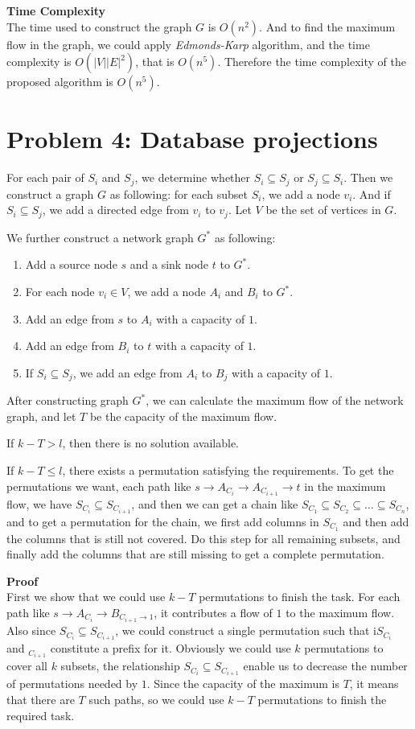 \documentclass{article}
\newcommand{\Complexity}{\vspace{0.3cm} \noindent\textbf{Time Complexity} \\}
\newcommand{\Proof}{\vspace{0.3cm} \noindent\textbf{Proof} \\}
\begin{document}
\Complexity
The time used to construct the graph $G$ is $O(n^2)$. And to find the maximum flow in the graph, we
could apply \textit{Edmonds-Karp} algorithm, and the time complexity is $O(|V||E|^2)$, that is
$O(n^5)$. Therefore the time complexity of the proposed algorithm is $O(n^5)$.

\section*{Problem 4: Database projections}
For each pair of $S_i$ and $S_j$, we determine whether $S_i \subseteq S_j$ or $S_j \subseteq
S_i$. Then we construct a graph $G$ as following: for each subset $S_i$, we add a node $v_i$. And if $S_i
\subseteq S_j$, we add a directed edge from $v_i$ to $v_j$. Let $V$ be the set of vertices in $G$.

We further construct a network graph $G^*$ as following:
\begin{enumerate}
  \item Add a source node $s$ and a sink node $t$ to $G^*$.
  \item For each node $v_i \in V$, we add a node $A_i$ and $B_i$ to $G^*$.
  \item Add an edge from $s$ to $A_i$ with a capacity of $1$.  
  \item Add an edge from $B_i$ to $t$ with a capacity of $1$.
  \item If $S_i \subseteq S_j$, we add an edge from $A_i$ to $B_j$ with a capacity of $1$.   
\end{enumerate}

After constructing graph $G^*$, we can calculate the maximum flow of the network graph, and let $T$
be the capacity of the maximum flow. 

If $k - T > l$, then there is no solution available. 

If $k-T \leq l$, there exists a permutation satisfying the requirements. To get the permutations we
want, each path like $s \rightarrow A_{C_i} \rightarrow A_{C_{i+1}} \rightarrow t$ in the maximum
flow, we have $S_{C_i} \subseteq S_{C_{i+1}}$, and then we can get a chain like $S_{C_{1}} \subseteq
S_{C_2} \subseteq \dots \subseteq S_{C_n}$, and to get a permutation for the chain, we first add
columns in $S_{C_1}$ and then add the columns that is still not covered. Do this step for all
remaining subsets, and finally add the columns that are still missing to get a complete permutation.          


\Proof
First we show that we could use $k-T$ permutations to finish the task. For each path like $s
\rightarrow A_{C_i} \rightarrow B_{C_{i+1} \rightarrow 1}$, it contributes a flow of $1$ to the
maximum flow. Also since $S_{C_i} \subseteq S_{C_{i+1}}$, we could construct a single permutation
such that i$S_{C_i}$ and $_{C_{i+1}}$ constitute a prefix for it. Obviously we could use $k$
permutations to cover all $k$ subsets, the relationship $S_{C_i} \subseteq S_{C_{i+1}}$ enable us to
decrease the number of permutations needed by $1$. Since the capacity of the maximum is $T$, it
means that there are $T$ such paths, so we could use $k-T$ permutations to finish the required task.
\end{document}
